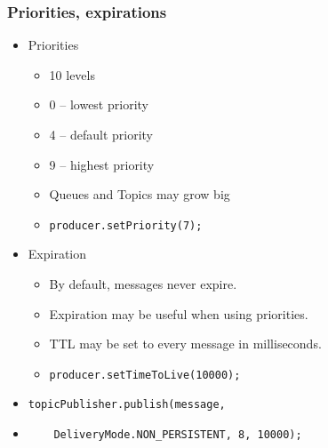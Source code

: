 \documentclass[10pt,xcolor=pdflatex]{beamer}
\begin{document}
\begin{frame}[containsverbatim]\frametitle{Priorities, expirations}
\begin{itemize}
	\item Priorities
      \begin{itemize}
    	\item 10 levels
		\item 0 – lowest priority
		\item 4 – default priority
		\item 9 – highest priority
		\item Queues and Topics may grow big
		\item \texttt{producer.setPriority(7);}
      \end{itemize}
    \item Expiration
	  \begin{itemize}
		\item By default, messages never expire.
		\item Expiration may be useful when using priorities.
		\item TTL may be set to every message in milliseconds.
		\item \texttt{producer.setTimeToLive(10000);}
	  \end{itemize}
	\item {\small \texttt{topicPublisher.publish(message,  }}
	\item[] {\small \texttt{ ~ ~DeliveryMode.NON\_PERSISTENT, 8, 10000);}}
\end{itemize}
\end{frame}
\end{document}
